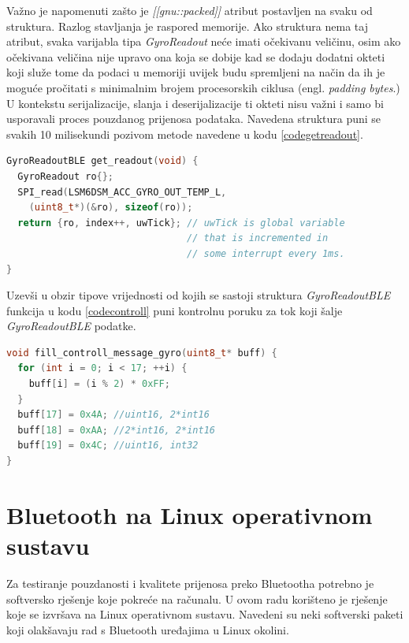 \documentclass[times, utf8, diplomski]{diplomski}
\begin{document}
Važno je napomenuti zašto je \textit{[[gnu::packed]]} atribut postavljen na svaku od struktura. Razlog stavljanja je raspored memorije.
Ako struktura nema taj atribut, svaka varijabla tipa \textit{GyroReadout} neće imati očekivanu veličinu, osim ako očekivana veličina nije upravo ona koja se dobije kad se dodaju dodatni okteti koji služe tome da podaci u memoriji uvijek budu spremljeni na način da ih je moguće pročitati s minimalnim brojem procesorskih ciklusa (engl. \textit{padding bytes}.)
U kontekstu serijalizacije, slanja i deserijalizacije ti okteti nisu važni i samo bi usporavali proces pouzdanog prijenosa podataka.
Navedena struktura puni se svakih 10 milisekundi pozivom metode navedene u kodu \ref{codegetreadout}.

\begin{lstlisting}[language=c++, caption={Dohvaćanje očitanja s LSM6DSM senzora}, label={codegetreadout}]
GyroReadoutBLE get_readout(void) {
  GyroReadout ro{};
  SPI_read(LSM6DSM_ACC_GYRO_OUT_TEMP_L,
    (uint8_t*)(&ro), sizeof(ro));
  return {ro, index++, uwTick}; // uwTick is global variable
                                // that is incremented in 
                                // some interrupt every 1ms.
}
\end{lstlisting}

Uzevši u obzir tipove vrijednosti od kojih se sastoji struktura \textit{GyroReadoutBLE} funkcija u kodu \ref{codecontroll} puni kontrolnu poruku za tok koji šalje \textit{GyroReadoutBLE} podatke.

\begin{lstlisting}[language=c++, caption={Funkcija koja puni kontrolnu poruku za žiroskopske podatke}, label={codecontroll}]
void fill_controll_message_gyro(uint8_t* buff) {
  for (int i = 0; i < 17; ++i) {
    buff[i] = (i % 2) * 0xFF;
  }
  buff[17] = 0x4A; //uint16, 2*int16
  buff[18] = 0xAA; //2*int16, 2*int16
  buff[19] = 0x4C; //uint16, int32
}
\end{lstlisting}

\section{Bluetooth na Linux operativnom sustavu}
Za testiranje pouzdanosti i kvalitete prijenosa preko Bluetootha potrebno je softversko rješenje koje pokreće na računalu. U ovom radu korišteno je rješenje koje se izvršava na Linux operativnom sustavu. Navedeni su neki softverski paketi koji olakšavaju rad s Bluetooth uređajima u Linux okolini.
\end{document}
